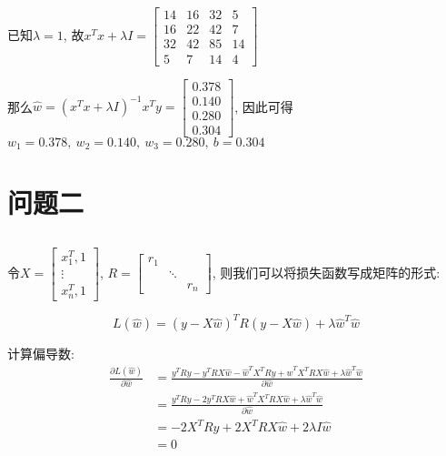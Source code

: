 \documentclass[12pt, a4paper]{article}
\begin{document}
\subsection{}

已知$\lambda = 1$, 故$x^Tx + \lambda I = \begin{bmatrix}
    14&16&32&5\\
    16&22&42&7\\
    32&42&85&14\\
    5&7&14&4
\end{bmatrix}$

那么$\hat{w} = (x^T x + \lambda I)^{-1}x^T y = \begin{bmatrix}
    0.378\\
    0.140\\
    0.280\\
    0.304
\end{bmatrix}$, 因此可得$w_1=0.378, \ w_2=0.140, \ w_3 = 0.280, \ b = 0.304$

\section{问题二}


\subsection{}

令$X = \begin{bmatrix}
    x_1^T, 1\\
    \vdots\\
    x_n^T, 1
\end{bmatrix}$, 
$R = \begin{bmatrix}
    r_1 &  & \\
    & \ddots & \\
    & & r_n
\end{bmatrix}$, 则我们可以将损失函数写成矩阵的形式:

\begin{equation*}
    L(\hat{w}) = (y - X \hat{w})^T R (y - X \hat{w}) + \lambda \hat{w}^T \hat{w}
\end{equation*}

计算偏导数:
\begin{align*}
    \frac{\partial L(\hat{w})}{\partial \hat{w}} &= \frac{y^T R y - y^T R X\hat{w}
    -\hat{w}^T X^T R y + \hat{w}^T X^T R X \hat{w}+\lambda \hat{w}^T \hat{w}}{\partial \hat{w}} \\
    &= \frac{y^T R y - 2 y^T R X\hat{w} + \hat{w}^T X^T R X \hat{w}
    +\lambda \hat{w}^T \hat{w}}{\partial \hat{w}} \\
    &= -2 X^T R y + 2 X^T R X \hat{w} + 2\lambda I \hat{w} \\
    &= 0
\end{align*}
\end{document}
